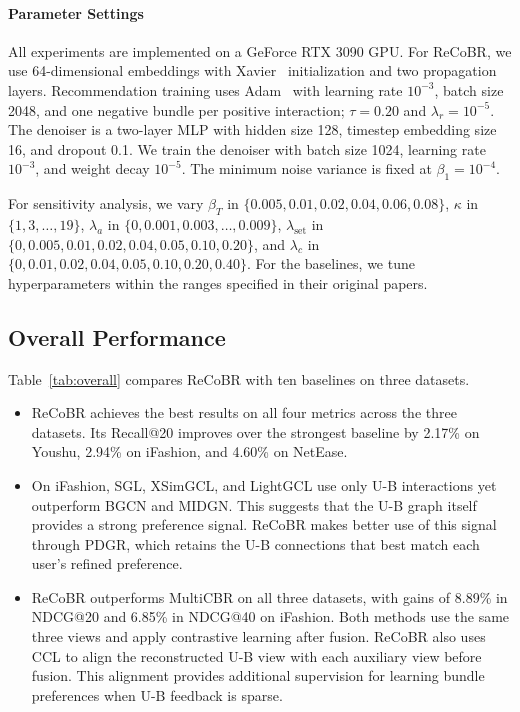 \documentclass[letterpaper,journal]{IEEEtran}
\begin{document}
\paragraph{Parameter Settings}
All experiments are implemented on a GeForce RTX 3090 GPU.
For ReCoBR, we use 64-dimensional embeddings with
Xavier~\cite{glorot2010xavier} initialization and two propagation
layers. Recommendation training uses
Adam~\cite{kingma2015adam} with learning rate $10^{-3}$,
batch size 2048, and one negative bundle per positive
interaction; $\tau=0.20$ and $\lambda_r=10^{-5}$.
The denoiser is a two-layer MLP with hidden size 128,
timestep embedding size 16, and dropout 0.1.
We train the denoiser with batch size 1024, learning rate
$10^{-3}$, and weight decay $10^{-5}$.
The minimum noise variance is fixed at $\beta_1=10^{-4}$.

For sensitivity analysis, we vary $\beta_T$ in
$\{0.005,\allowbreak 0.01,\allowbreak 0.02,\allowbreak 0.04,\allowbreak 0.06,\allowbreak 0.08\}$, $\kappa$ in
$\{1,3,\ldots,19\}$, $\lambda_a$ in
$\{0,\allowbreak 0.001,\allowbreak 0.003,\allowbreak \ldots,\allowbreak 0.009\}$,
$\lambda_{\mathrm{set}}$ in
$\{0,\allowbreak 0.005,\allowbreak 0.01,\allowbreak 0.02,\allowbreak 0.04,\allowbreak 0.05,\allowbreak 0.10,\allowbreak 0.20\}$, and $\lambda_c$ in
$\{0,\allowbreak 0.01,\allowbreak 0.02,\allowbreak 0.04,\allowbreak 0.05,\allowbreak 0.10,\allowbreak 0.20,\allowbreak 0.40\}$.
For the baselines, we tune hyperparameters within the ranges
specified in their original papers.

\subsection{Overall Performance}

Table~\ref{tab:overall} compares ReCoBR with ten baselines on three datasets.
\begin{itemize}
\item ReCoBR achieves the best results on all four metrics across
the three datasets. Its Recall@20 improves over the strongest
baseline by 2.17\% on Youshu, 2.94\% on iFashion, and 4.60\% on
NetEase.
\item On iFashion, SGL, XSimGCL, and LightGCL use only U-B
interactions yet outperform BGCN and MIDGN. This suggests that
the U-B graph itself provides a strong preference signal. ReCoBR
makes better use of this signal through PDGR, which retains the
U-B connections that best match each user's refined preference.
\item ReCoBR outperforms MultiCBR on all three datasets, with
gains of 8.89\% in NDCG@20 and 6.85\% in NDCG@40 on iFashion.
Both methods use the same three views and apply contrastive
learning after fusion. ReCoBR also uses CCL to align the
reconstructed U-B view with each auxiliary view before fusion.
This alignment provides additional supervision for learning
bundle preferences when U-B feedback is sparse.
\end{itemize}
\end{document}
